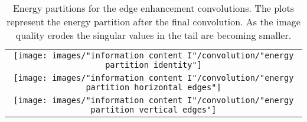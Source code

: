 \begin{table}[htdp]
\caption[Energy partitions for the edge enhancement convolutions]{Energy partitions for the edge enhancement convolutions. The plots represent the energy partition after the final convolution. As the image quality erodes the singular values in the tail are becoming smaller.}
\begin{center}
\begin{tabular}{c}
%
 \texttt{[image: images/"information content I"/convolution/"energy partition identity"]} \\[15pt]
%
 \texttt{[image: images/"information content I"/convolution/"energy partition horizontal edges"]} \\[15pt]
%
 \texttt{[image: images/"information content I"/convolution/"energy partition vertical edges"]}
%
\end{tabular}
\end{center}
\label{default}
\end{table}%

\endinput